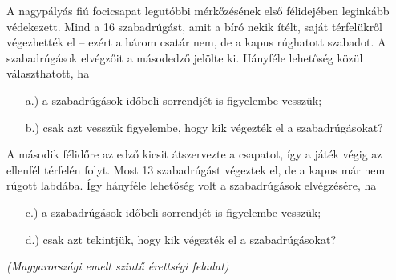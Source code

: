 \begin{extraproblem}
A nagypályás fiú focicsapat legutóbbi mérkőzésének első félidejében
leginkább védekezett. Mind a 16 szabadrúgást, amit a bíró nekik ítélt,
saját térfelükről végezhették el -- ezért a három csatár nem, de
a kapus rúghatott szabadot. A szabadrúgások elvégzőit a másodedző
jelölte ki. Hányféle lehetőség közül választhatott, ha 
\begin{itemize}
\item[a.)] a szabadrúgások időbeli sorrendjét is figyelembe vesszük; 
\item[b.)] csak azt vesszük figyelembe, hogy kik végezték el a szabadrúgásokat? 
\end{itemize}
A második félidőre az edző kicsit átszervezte a csapatot, így a játék
végig az ellenfél térfelén folyt. Most 13 szabadrúgást végeztek el,
de a kapus már nem rúgott labdába. Így hányféle lehetőség volt a szabadrúgások
elvégzésére, ha 
\begin{itemize}
\item[c.)] a szabadrúgások időbeli sorrendjét is figyelembe vesszük; 
\item[d.)] csak azt tekintjük, hogy kik végezték el a szabadrúgásokat? 
\end{itemize}
\begin{flushright}
\textit{(Magyarországi emelt szintű érettségi feladat)} 
\par\end{flushright}
\end{extraproblem}

